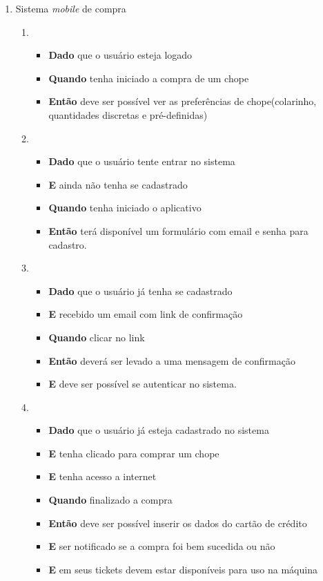 		\begin{enumerate}

			\item Sistema \textit{mobile} de compra
				\begin{enumerate}
					\item 
						\begin{itemize}
							\item \textbf{Dado} que o usuário esteja logado 
							\item \textbf{Quando} tenha iniciado a compra de um chope 
							\item \textbf{Então} deve ser possível ver as preferências de chope(colarinho, quantidades discretas e pré-definidas) 
						\end{itemize}

				\item 
						\begin{itemize}
							\item \textbf{Dado} que o usuário tente entrar no sistema
							\item \textbf{E} ainda não tenha se cadastrado
							\item \textbf{Quando} tenha iniciado o aplicativo 
							\item \textbf{Então} terá disponível um formulário com email e senha para cadastro.
						\end{itemize}

				\item 
						\begin{itemize}
							\item \textbf{Dado} que o usuário já tenha se cadastrado
							\item \textbf{E} recebido um email com link de confirmação
							\item \textbf{Quando} clicar no link
							\item \textbf{Então} deverá ser levado a uma mensagem de confirmação
							\item \textbf{E} deve ser possível se autenticar no sistema.
						\end{itemize}

				\item 
						\begin{itemize}
							\item \textbf{Dado} que o usuário já esteja cadastrado no sistema
							\item \textbf{E} tenha clicado para comprar um chope
							\item \textbf{E} tenha acesso a internet
							\item \textbf{Quando} finalizado a compra 
							\item \textbf{Então} deve ser possível inserir os dados do cartão de crédito
							\item \textbf{E} ser notificado se a compra foi bem sucedida ou não
							\item \textbf{E} em seus tickets devem estar disponíveis para uso na máquina
						\end{itemize}


\end{enumerate}
\end{enumerate}
